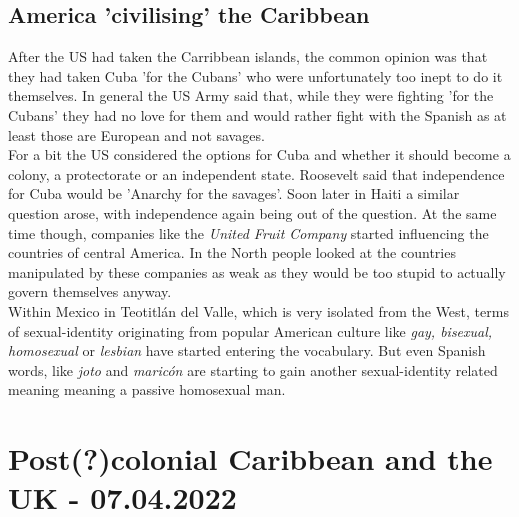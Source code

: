 \documentclass{article}
\begin{document}
	\subsection{America 'civilising' the Caribbean}
	After the US had taken the Carribbean islands, the common opinion was that they had taken Cuba 'for the Cubans' who were unfortunately too inept to do it themselves. In general the US Army said that, while they were fighting 'for the Cubans' they had no love for them and would rather fight with the Spanish as at least those are European and not savages. \\
	For a bit the US considered the options for Cuba and whether it should become a colony, a protectorate or an independent state. Roosevelt said that independence for Cuba would be 'Anarchy for the savages'. Soon later in Haiti a similar question arose, with independence again being out of the question. At the same time though, companies like the \textit{United Fruit Company} started influencing the countries of central America. In the North people looked at the countries manipulated by these companies as weak as they would be too stupid to actually govern themselves anyway. \\
	Within Mexico in Teotitlán del Valle, which is very isolated from the West, terms of sexual-identity originating from popular American culture like \textit{gay, bisexual, homosexual} or \textit{lesbian} have started entering the vocabulary. But even Spanish words, like \textit{joto} and \textit{maricón} are starting to gain another sexual-identity related meaning meaning a passive homosexual man.

	\section{Post(?)colonial Caribbean and the UK - 07.04.2022}
\end{document}
